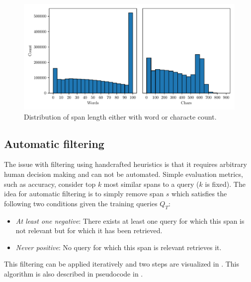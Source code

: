 \begin{figure}[ht]
    \center
    \includegraphics[width=\linewidth]{img/filter_distribution.pdf}
    
    \caption{Distribution of span length either with word or characte count.}
    \label{fig:filter_distribution}
\end{figure}

\subsection{Automatic filtering}

The issue with filtering using handcrafted heuristics is that it requires arbitrary human decision making and can not be automated.
Simple evaluation metrics, such as accuracy, consider top $k$ most similar spans to a query ($k$ is fixed).
The idea for automatic filtering is to simply remove span $s$ which satisfies the following two conditions given the training queries $Q_T$:
\begin{itemize}
    \item \emph{At least one negative}: There exists at least one query for which this span is not relevant but for which it has been retrieved.
    \item \emph{Never positive}: No query for which this span is relevant retrieves it.
\end{itemize}

This filtering can be applied iteratively and two steps are visualized in .
This algorithm is also described in pseudocode in .

